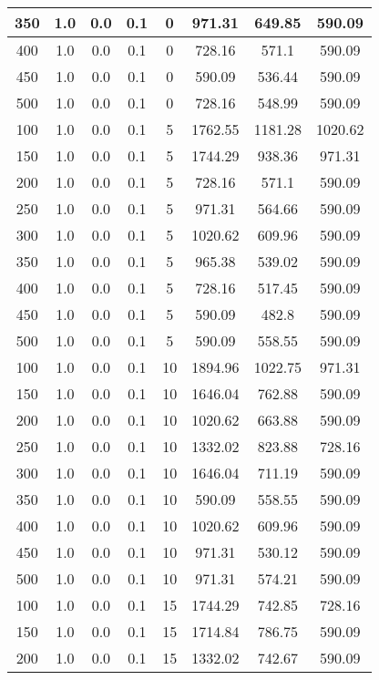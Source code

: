 \documentclass[a4paper, 12pt]{extreport}
\begin{document}
\begin{itemize}
\begin{longtable}{|c|c|c|c|c|c|c|c|}
			350 & 1.0 & 0.0 & 0.1 & 0 & 971.31 & 649.85 & 590.09 \\\hline
			400 & 1.0 & 0.0 & 0.1 & 0 & 728.16 & 571.1 & 590.09 \\\hline
			450 & 1.0 & 0.0 & 0.1 & 0 & 590.09 & 536.44 & 590.09 \\\hline
			500 & 1.0 & 0.0 & 0.1 & 0 & 728.16 & 548.99 & 590.09 \\\hline
			100 & 1.0 & 0.0 & 0.1 & 5 & 1762.55 & 1181.28 & 1020.62 \\\hline
			150 & 1.0 & 0.0 & 0.1 & 5 & 1744.29 & 938.36 & 971.31 \\\hline
			200 & 1.0 & 0.0 & 0.1 & 5 & 728.16 & 571.1 & 590.09 \\\hline
			250 & 1.0 & 0.0 & 0.1 & 5 & 971.31 & 564.66 & 590.09 \\\hline
			300 & 1.0 & 0.0 & 0.1 & 5 & 1020.62 & 609.96 & 590.09 \\\hline
			350 & 1.0 & 0.0 & 0.1 & 5 & 965.38 & 539.02 & 590.09 \\\hline
			400 & 1.0 & 0.0 & 0.1 & 5 & 728.16 & 517.45 & 590.09 \\\hline
			450 & 1.0 & 0.0 & 0.1 & 5 & 590.09 & 482.8 & 590.09 \\\hline
			500 & 1.0 & 0.0 & 0.1 & 5 & 590.09 & 558.55 & 590.09 \\\hline
			100 & 1.0 & 0.0 & 0.1 & 10 & 1894.96 & 1022.75 & 971.31 \\\hline
			150 & 1.0 & 0.0 & 0.1 & 10 & 1646.04 & 762.88 & 590.09 \\\hline
			200 & 1.0 & 0.0 & 0.1 & 10 & 1020.62 & 663.88 & 590.09 \\\hline
			250 & 1.0 & 0.0 & 0.1 & 10 & 1332.02 & 823.88 & 728.16 \\\hline
			300 & 1.0 & 0.0 & 0.1 & 10 & 1646.04 & 711.19 & 590.09 \\\hline
			350 & 1.0 & 0.0 & 0.1 & 10 & 590.09 & 558.55 & 590.09 \\\hline
			400 & 1.0 & 0.0 & 0.1 & 10 & 1020.62 & 609.96 & 590.09 \\\hline
			450 & 1.0 & 0.0 & 0.1 & 10 & 971.31 & 530.12 & 590.09 \\\hline
			500 & 1.0 & 0.0 & 0.1 & 10 & 971.31 & 574.21 & 590.09 \\\hline
			100 & 1.0 & 0.0 & 0.1 & 15 & 1744.29 & 742.85 & 728.16 \\\hline
			150 & 1.0 & 0.0 & 0.1 & 15 & 1714.84 & 786.75 & 590.09 \\\hline
			200 & 1.0 & 0.0 & 0.1 & 15 & 1332.02 & 742.67 & 590.09 \\\hline

\end{longtable}
\end{itemize}
\end{document}
